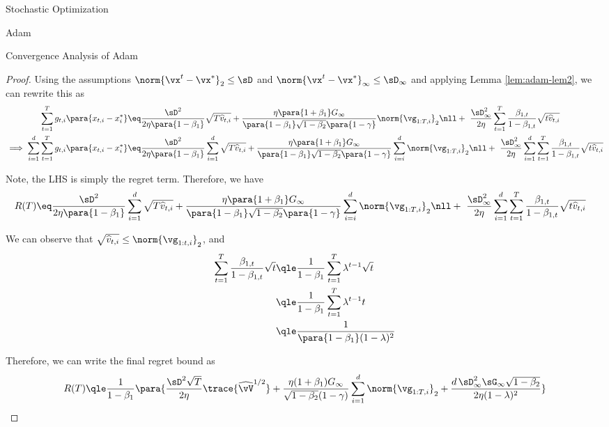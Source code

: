 \documentclass{article}
\begin{document}
\begin{psection}{Stochastic Optimization}
\begin{psubsection}{Adam}
\begin{pssubsection}{Convergence Analysis of Adam}
\begin{proof}
				Using the assumptions $\norm{\x{t} - \xs}_2 \le \sD$ and $\norm{\x{t} - \xs}_{\infty} \le \sD_{\infty}$ and applying Lemma \ref{lem:adam-lem2}, we can rewrite this as
				\begin{align*}
					\sum_{t = 1}^T g_{t, i} \para{x_{t, i} - x^{\ast}_i} &\eq \frac{\sD^2}{2 \eta \para{1 - \beta_1}} \sqrt{T \widehat{v}_{t, i}} + \frac{\eta \para{1 + \beta_1} G_{\infty}}{\para{1 - \beta_1} \sqrt{1 - \beta_2} \para{1 - \gamma}} \norm{\vg_{1:T, i}}_2 \nll + \ \frac{\sD_{\infty}^2}{2 \eta} \sum_{t = 1}^T \frac{\beta_{1, t}}{1 - \beta_{1, t}} \sqrt{t \widehat{v}_{t, i}} \\
					\implies \sum_{i = 1}^d \sum_{t = 1}^T g_{t, i} \para{x_{t, i} - x^{\ast}_i} &\eq \frac{\sD^2}{2 \eta \para{1 - \beta_1}} \sum_{i = 1}^d \sqrt{T \widehat{v}_{t, i}} + \frac{\eta \para{1 + \beta_1} G_{\infty}}{\para{1 - \beta_1} \sqrt{1 - \beta_2} \para{1 - \gamma}} \sum_{i = i}^d \norm{\vg_{1:T, i}}_2 \nll + \ \frac{\sD_{\infty}^2}{2 \eta} \sum_{i = 1}^d \sum_{t = 1}^T \frac{\beta_{1, t}}{1 - \beta_{1, t}} \sqrt{t \widehat{v}_{t, i}}
				\end{align*}

				Note, the LHS is simply the regret term. Therefore, we have
				\begin{align*}
					R(T) &\eq \frac{\sD^2}{2 \eta \para{1 - \beta_1}} \sum_{i = 1}^d \sqrt{T \widehat{v}_{t, i}} + \frac{\eta \para{1 + \beta_1} G_{\infty}}{\para{1 - \beta_1} \sqrt{1 - \beta_2} \para{1 - \gamma}} \sum_{i = i}^d \norm{\vg_{1:T, i}}_2 \nll + \ \frac{\sD_{\infty}^2}{2 \eta} \sum_{i = 1}^d \sum_{t = 1}^T \frac{\beta_{1, t}}{1 - \beta_{1, t}} \sqrt{t \widehat{v}_{t, i}}
				\end{align*}

				We can observe that $\sqrt{\widehat{v}_{t, i}} \le \norm{\vg_{1:t, i}}_2$, and
				\begin{align*}
					\sum_{t = 1}^T \frac{\beta_{1, t}}{1 - \beta_{1, t}} \sqrt{t} &\qle \frac{1}{1 - \beta_1} \sum_{t = 1}^T \lambda^{t - 1} \sqrt{t} \\
					&\qle \frac{1}{1 - \beta_1} \sum_{t = 1}^T \lambda^{t - 1} t \\
					&\qle \frac{1}{\para{1 - \beta_1}(1 - \lambda)^2}
				\end{align*}

				Therefore, we can write the final regret bound as
				\begin{align*}
					R(T) \qle \frac{1}{1 - \beta_1} \para{\frac{\sD^2 \sqrt{T}}{2 \eta} \trace{\widehat{\vV}^{1 / 2}} + \frac{\eta (1 + \beta_1) G_{\infty}}{\sqrt{1 - \beta_2} (1 - \gamma)} \sum_{i = 1}^d \norm{\vg_{1:T, i}}_2 + \frac{d \,\sD_{\infty}^2 \sG_{\infty} \sqrt{1 - \beta_2}}{2 \eta (1 - \lambda)^2}}
				\end{align*}
			\end{proof}


\end{pssubsection}
\end{psubsection}
\end{psection}
\end{document}
